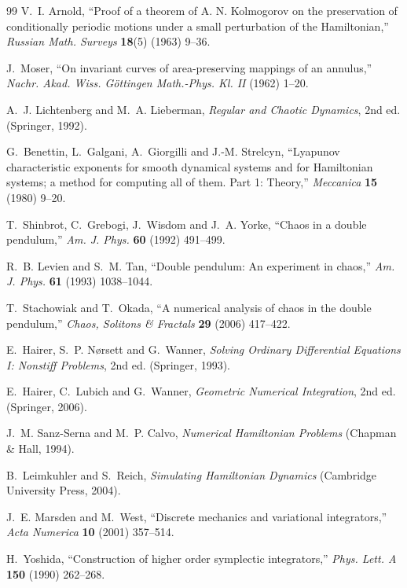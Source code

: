 \documentclass[11pt,a4paper]{book}
\theoremstyle{definition}
\theoremstyle{remark}
\begin{document}
\begin{thebibliography}{99}
 V.~I. Arnold, ``Proof of a theorem of A. N. Kolmogorov on the preservation of conditionally
periodic motions under a small perturbation of the Hamiltonian,'' \emph{Russian Math. Surveys} \textbf{18}(5) (1963) 9--36.

 J.~Moser, ``On invariant curves of area-preserving mappings of an annulus,''
\emph{Nachr. Akad. Wiss. G\"ottingen Math.-Phys. Kl. II} (1962) 1--20.

 A.~J. Lichtenberg and M.~A. Lieberman, \emph{Regular and Chaotic Dynamics}, 2nd ed.
(Springer, 1992).

 G.~Benettin, L.~Galgani, A.~Giorgilli and J.-M. Strelcyn, ``Lyapunov characteristic exponents for
smooth dynamical systems and for Hamiltonian systems; a method for computing all of them. Part 1: Theory,''
\emph{Meccanica} \textbf{15} (1980) 9--20.

 T.~Shinbrot, C.~Grebogi, J.~Wisdom and J.~A. Yorke, ``Chaos in a double pendulum,''
\emph{Am. J. Phys.} \textbf{60} (1992) 491--499.

 R.~B. Levien and S.~M. Tan, ``Double pendulum: An experiment in chaos,''
\emph{Am. J. Phys.} \textbf{61} (1993) 1038--1044.

 T.~Stachowiak and T.~Okada, ``A numerical analysis of chaos in the double pendulum,''
\emph{Chaos, Solitons \& Fractals} \textbf{29} (2006) 417--422.

 E.~Hairer, S.~P. N{\o}rsett and G.~Wanner, \emph{Solving Ordinary Differential Equations I: Nonstiff
Problems}, 2nd ed. (Springer, 1993).

 E.~Hairer, C.~Lubich and G.~Wanner, \emph{Geometric Numerical Integration}, 2nd ed.
(Springer, 2006).

 J.~M. Sanz-Serna and M.~P. Calvo, \emph{Numerical Hamiltonian Problems}
(Chapman \& Hall, 1994).

 B.~Leimkuhler and S.~Reich, \emph{Simulating Hamiltonian Dynamics} (Cambridge University Press, 2004).

 J.~E. Marsden and M.~West, ``Discrete mechanics and variational integrators,''
\emph{Acta Numerica} \textbf{10} (2001) 357--514.

 H.~Yoshida, ``Construction of higher order symplectic integrators,''
\emph{Phys. Lett. A} \textbf{150} (1990) 262--268.

\end{thebibliography}
\end{document}
